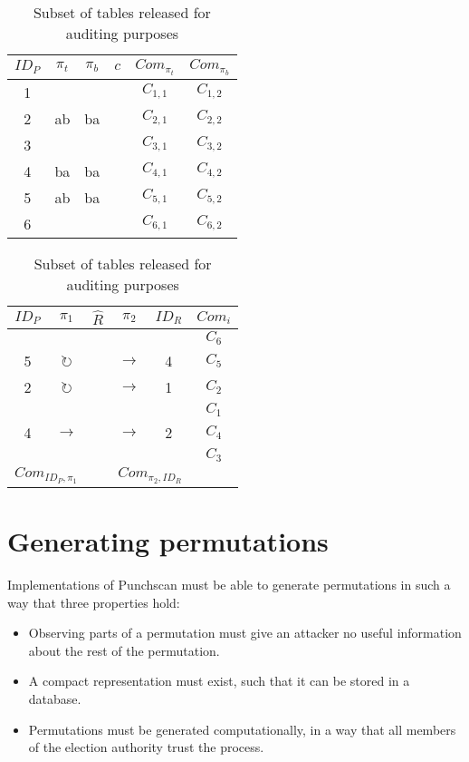 \begin{table}
	\centering
	\begin{subtable}{.5\linewidth}
		\begin{tabular}{|c|c|c|c|c|c|}
			\hline
			$ID_P$ & $\pi_{t}$ & $\pi_{b}$ & $c$ & $Com_{\pi_{t}}$ & $Com_{\pi_{b}}$ \\
			\hline
			1 & & & & $C_{1, 1}$ & $C_{1, 2}$ \\
			2 & ab & ba & & $C_{2, 1}$ & $C_{2, 2}$ \\
			3 & & & & $C_{3, 1}$ & $C_{3, 2}$ \\
			4 & ba & ba & & $C_{4, 1}$ & $C_{4, 2}$ \\
			5 & ab & ba & & $C_{5, 1}$ & $C_{5, 2}$ \\
			6 & & & & $C_{6, 1}$ & $C_{6, 2}$ \\
			\hline
		\end{tabular}
	\end{subtable}%
	\begin{subtable}{.5\linewidth}
		\begin{tabular}{|c|c|c|c|c|c|}
			\hline
			$ID_P$ & $\pi_1$ & $\hat{R}$ & $\pi_2$ & $ID_R$ & $Com_{i}$ \\
			\hline
			&                     & &                     &   & $C_6$ \\
			5 & $\circlearrowright$ & & $\rightarrow$       & 4 & $C_5$ \\
			2 & $\circlearrowright$ & & $\rightarrow$       & 1 & $C_2$ \\
			&                     & &                     &   & $C_1$ \\
			4 & $\rightarrow$       & & $\rightarrow$       & 2 & $C_4$ \\
			&                     & &                     &   & $C_3$ \\
			\hline
			\multicolumn{2}{|c|}{$Com_{ID_P, \pi_1}$} &   & \multicolumn{2}{c|}{$Com_{\pi_2, ID_R}$} & \\
			\hline
		\end{tabular}
	\end{subtable}
	\caption{Subset of tables released for auditing purposes}
	\label{tbl:setup_audit_revealed}
\end{table}

\section{Generating permutations}
\label{sec:generating_permutations}

Implementations of Punchscan must be able to generate permutations in such a
way that three properties hold:
\begin{itemize}
	\item Observing parts of a permutation must give an attacker no useful information about the rest of the permutation.
	\item A compact representation must exist, such that it can be stored in a database.
	\item Permutations must be generated computationally, in a way that all
		members of the election authority trust the process.
\end{itemize}

